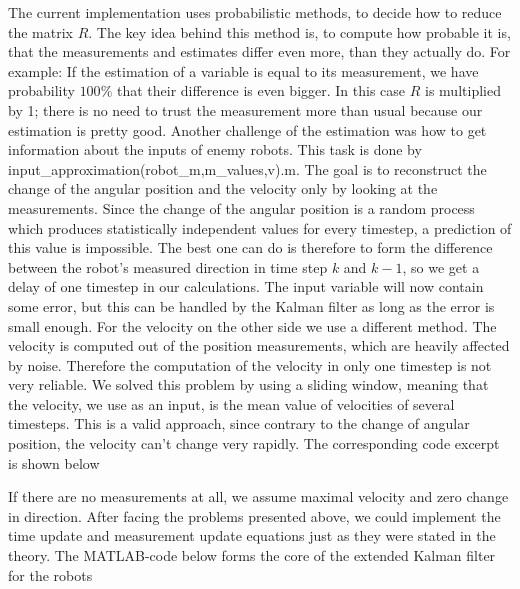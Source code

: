 

The current implementation uses probabilistic methods, to decide how to reduce the matrix \(R\). The key idea behind this method is, to compute how probable it is, that the measurements and estimates differ even more, than they actually do. For example: If the estimation of a variable is equal to its measurement, we have probability \(100\%\) that their difference is even bigger. In this case \(R\) is multiplied by 1; there is no need to trust the measurement more than usual because our estimation is pretty good.
Another challenge of the estimation was how to get information about the inputs of enemy robots. This task is done by {\selectfont input\_approximation(robot\_m,m\_values,v).m}. The goal is to reconstruct the change of the angular position and the velocity only by looking at the measurements. Since the change of the angular position is a random process which produces statistically independent values for every timestep, a prediction of this value is impossible. The best one can do is therefore to form the difference between the robot's measured direction in time step \(k\) and \(k-1\), so we get a delay of one timestep in our calculations. The input variable will now contain some error, but this can be handled by the Kalman filter as long as the error is small enough. For the velocity on the other side we use a different method. The velocity is computed out of the position measurements, which are heavily affected by noise. Therefore the computation of the velocity in only one timestep is not very reliable. We solved this problem by using a sliding window, meaning that the velocity, we use as an input, is the mean value of velocities of several timesteps. This is a valid approach, since contrary to the change of angular position, the velocity can't change very rapidly. The corresponding code excerpt is shown below



If there are no measurements at all, we assume maximal velocity and zero change in direction.
After facing the problems presented above, we could implement the time update and measurement update equations just as they were stated in the theory. The MATLAB-code below forms the core of the extended Kalman filter for the robots


\parskip 20pt

